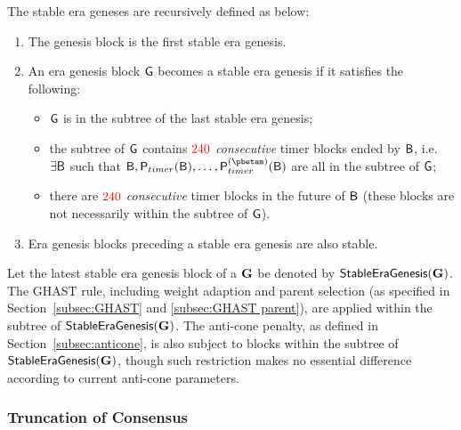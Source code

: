 {	The stable era geneses are recursively defined as below:
	\begin{enumerate}[]
		\item The genesis block is the first stable era genesis.

		\item An era genesis block $\textsf{G}$ becomes a stable era genesis if it satisfies the following:
		\begin{itemize}[nosep]
			\item $\textsf{G}$ is in the subtree of the last stable era genesis;

			\item the subtree of $\textsf{G}$ contains ${\color{red}240}$ \emph{consecutive} timer blocks ended by $\textsf{B}$, 
			i.e. $\exists \textsf{B}$ such that $\block,\parentf_{timer}(\block),\dots,\parentf_{timer}^{(\pbetam)}(\block)$ are all in the subtree of $\textsf{G}$;

			\item there are ${\color{red}240}$ \emph{consecutive} timer blocks in the future of $\textsf{B}$ (these blocks are not necessarily within the subtree of $\textsf{G}$).
		\end{itemize}

		\item Era genesis blocks preceding a stable era genesis are also stable.
	\end{enumerate}
	 

	Let the latest stable era genesis block of a \tg $\textbf{G}$ be denoted by $\mathsf{StableEraGenesis}(\textbf{G})$.
	The GHAST rule, including weight adaption and parent selection (as specified in Section~\ref{subsec:GHAST} and \ref{subsec:GHAST parent}), are applied within the subtree of $\mathsf{StableEraGenesis}(\textbf{G})$. 
	The anti-cone penalty, as defined in Section~\ref{subsec:anticone}, is also subject to blocks within the subtree of $\mathsf{StableEraGenesis}(\textbf{G})$, 
	though such restriction makes no essential difference according to  current anti-cone parameters.




\subsubsection{Truncation of Consensus \tg}\label{sec:truncate}
	
}
